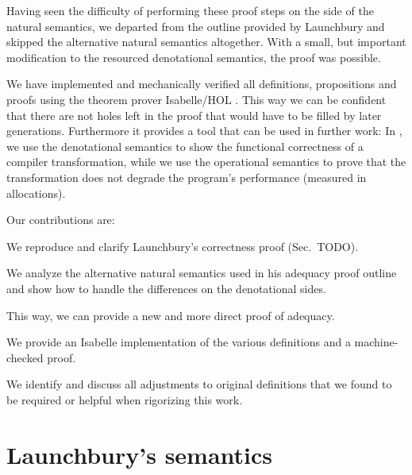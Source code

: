 \documentclass{jfp1}
\theoremstyle{nonumberbreak}
\begin{document}
Having seen the difficulty of performing these proof steps on the side of the natural semantics, we departed from the outline provided by Launchbury and skipped the alternative natural semantics altogether. With a small, but important modification to the resourced denotational semantics, the proof was possible.

We have implemented and mechanically verified all definitions, propositions and proofs using the theorem prover Isabelle/HOL \cite{afp}. This way we can be confident that there are not holes left in the proof that would have to be filled by later generations. Furthermore it provides a tool that can be used in further work: In \cite{arity-afp}, we use the denotational semantics to show the functional correctness of a compiler transformation, while we use the operational semantics to prove that the transformation does not degrade the program’s performance (measured in allocations).


Our contributions are:
\begin{compactitem}
\item We reproduce and clarify Launchbury’s correctness proof (Sec.~TODO).
\item We analyze the alternative natural semantics used in his adequacy proof outline and show how to handle the differences on the denotational sides.
\item This way, we can provide a new and more direct proof of adequacy.
\item We provide an Isabelle implementation of the various definitions and a machine-checked proof.
\item We identify and discuss all adjustments to original definitions that we found to be required or helpful when rigorizing this work.
\end{compactitem}

\section{Launchbury's semantics}
\end{document}
